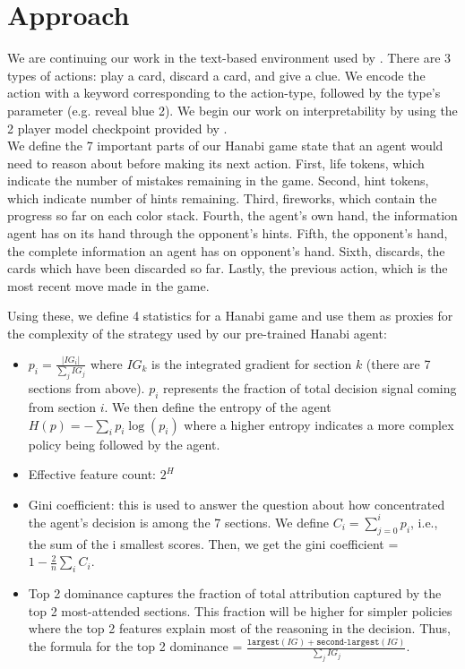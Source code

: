 \documentclass{article}
\begin{document}
\section{Approach}

We are continuing our work in the text-based environment used by \cite{sudhakar2025generalist}. There are 3 types of actions: play a card, discard a card, and give a clue. We encode the action with a keyword corresponding to the action-type, followed by the type’s parameter (e.g. reveal blue 2). We begin our work on interpretability by using the 2 player model checkpoint provided by \cite{sudhakar2025generalist}.\\

We define the 7 important parts of our Hanabi game state that an agent would need to reason about before making its next action. First, life tokens, which indicate the number of mistakes remaining in the game. Second, hint tokens, which indicate number of hints remaining. Third, fireworks, which contain the progress so far on each color stack. Fourth, the agent's own hand, the information agent has on its hand through the opponent's hints. Fifth, the opponent's hand, the complete information an agent has on opponent's hand. Sixth, discards, the cards which have been discarded so far. Lastly, the previous action, which is the most recent move made in the game.

Using these, we define 4 statistics for a Hanabi game and use them as proxies for the complexity of the strategy used by our pre-trained Hanabi agent:

\begin{itemize}
    \item $p_i = \frac{|IG_i|}{\sum_j IG_j}$ where $IG_k$ is the integrated gradient for section $k$ (there are 7 sections from above). $p_i$ represents the fraction of total decision signal coming from section $i$. We then define the entropy of the agent $H(p) = -\sum_i p_i \log(p_i)$ where a higher entropy indicates a more complex policy being followed by the agent.
    \item Effective feature count: $2^H$
    \item Gini coefficient: this is used to answer the question about how concentrated the agent's decision is among the 7 sections. We define $C_i = \sum_{j=0}^i p_i$, i.e., the sum of the i smallest scores. Then, we get the gini coefficient = $1 - \frac{2}{n} \sum_i C_i$.
    \item Top 2 dominance captures the fraction of total attribution captured by the top 2 most-attended sections. This fraction will be higher for simpler policies where the top 2 features explain most of the reasoning in the decision. Thus, the formula for the top 2 dominance = $\frac{\texttt{largest}(IG) + \texttt{second-largest}(IG)}{\sum_j IG_j}$.
\end{itemize}
\end{document}
